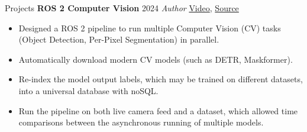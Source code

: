 \begin{rubric}{Projects}
\entry*[] \textbf{ROS 2 Computer Vision} \hfill 2024 \newline
\emph{Author} \hfill \href{https://github.com/NathanCorral/ROS-HF-Vision/blob/main/doc/gifs/ex_german_roads.gif}{Video}, \href{https://github.com/NathanCorral/ROS-HF-Vision/tree/main}{\faGithub Source} \newline
\vspace{\CVItemizeHeaderSpacing} \begin{itemize}[leftmargin=*, rightmargin=1cm]
	\setlength{\itemsep}{\CVItemizeSpacing}
	\item Designed a ROS 2 pipeline to run multiple Computer Vision (CV) tasks (Object Detection, Per-Pixel Segmentation) in parallel.  
	\item Automatically download modern CV models (such as DETR, Maskformer).  
	\item Re-index the model output labels, which may be trained on different datasets, into a universal database with noSQL.  
	\item Run the pipeline on both live camera feed and a dataset, which allowed time comparisons between the asynchronous running of multiple models.
\end{itemize}
\begin{comment}
\entry*[] \textbf{Semantic Search using Facebook AI Similarity (FAISS)} \hfill 2024 \newline \emph{Author} \hfill \href{https://github.com/NathanCorral/Hugging-Face-FAISS-Semantic-Search}{\faGithub Source} \newline
\vspace{\CVItemizeHeaderSpacing} \begin{itemize}[leftmargin=*, rightmargin=1cm]
	\setlength{\itemsep}{\CVItemizeSpacing}
	\item Implemented the first steps in Retrieval-Augmented Generation (ending before "Generation").
	\item Programmed web-scraping, dataset embedding, and similarity comparisons to recover matches in the dataset from a natural language query.
\end{itemize}
\end{comment}
\begin{comment}
\entry*[2021] \textbf{Temporal Convolutional Network} \newline
As part of a class project, we re-implemented the Multi-Stage Temporal Convolutional Network\footnote{Y. Abu Farha et al., "MS-TCN: Multi-Stage Temporal Convolutional Network for Action Segmentation." CVPR 2019.} in PyTorch.  This project achieved: \newline

\end{comment}
\end{rubric}
